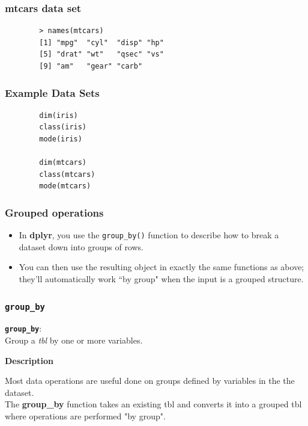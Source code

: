 \documentclass{beamer}
\begin{document}
\begin{frame}[fragile]
	
	\frametitle{mtcars data set}
	\LARGE
	\begin{framed}
		\begin{verbatim}
		> names(mtcars)
		[1] "mpg"  "cyl"  "disp" "hp"  
		[5] "drat" "wt"   "qsec" "vs"  
		[9] "am"   "gear" "carb"
		\end{verbatim}
	\end{framed}
\end{frame}
\begin{frame}[fragile]
	\frametitle{Example Data Sets}
	\LARGE
	\begin{framed}
		\begin{verbatim}
		dim(iris)
		class(iris)
		mode(iris)
		
		dim(mtcars)
		class(mtcars)
		mode(mtcars)
		\end{verbatim}
	\end{framed}
\end{frame}
\begin{frame}
	\frametitle{Grouped operations}
	\LARGE
	\begin{itemize}
		
		\item In \textbf{dplyr}, you use the \texttt{group\_by()} function to describe how to break a dataset down into groups of rows. \bigskip
		\item You can then use the resulting object in exactly the same functions as above; they’ll automatically work ``by group" when the input is a grouped structure.
	\end{itemize}
\end{frame}
\begin{frame}
	
	\frametitle{\texttt{group\_by }}
	{
		\LARGE
		\textbf{\texttt{group\_by}}:\\ \bigskip
	}
	\LARGE
	Group a \textit{tbl} by one or more variables.\\ \bigskip
	
	
	\textbf{Description}\\ \bigskip
	
	Most data operations are useful done on groups defined by variables in the the dataset. \\ The
	\textbf{group\_by} function takes an existing tbl and converts it into a grouped tbl where operations are
	performed "by group".
	
\end{frame}
\end{document}
